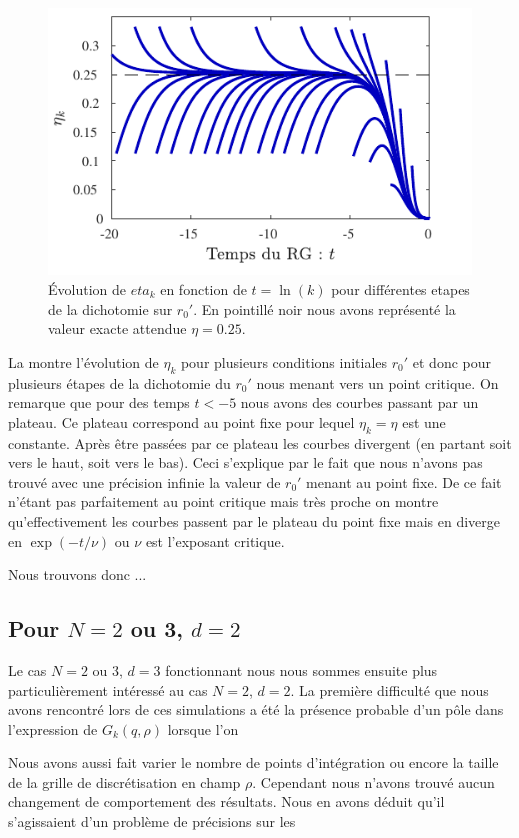\documentclass[10pt]{article}
\begin{document}
\begin{multicols}{2}
\begin{figure}[H]
	\begin{center}
		\includegraphics[width=0.95\columnwidth]{etakd2.pdf}
		\caption{Évolution de $eta_k$ en fonction de $t= \ln(k)$ pour différentes etapes de la dichotomie sur $r_0'$. En pointillé noir nous avons représenté la valeur exacte attendue $\eta = 0.25$. }
		\label{fig:etakd2}
	\end{center}
\end{figure}

La  montre l'évolution de $\eta_k$ pour plusieurs conditions initiales $r_0'$ et donc pour plusieurs étapes de la dichotomie du $r_0'$ nous menant vers un point critique. On remarque que pour des temps $t<-5$ nous avons des courbes passant par un plateau. Ce plateau correspond au point fixe pour lequel $\eta_k = \eta$ est une constante. Après être passées par ce plateau les courbes divergent (en partant soit vers le haut, soit vers le bas). Ceci s'explique par le fait que nous n'avons pas trouvé avec une précision infinie la valeur de $r_0'$ menant au point fixe. De ce fait n'étant pas parfaitement au point critique mais très proche on montre qu'effectivement les courbes passent par le plateau du point fixe mais en diverge en $\exp(-t/\nu)$ ou $\nu$ est l'exposant critique.

Nous trouvons donc ...\\



\subsection{Pour $N = 2$ ou 3, $d=2$}

Le cas $N = 2$ ou 3, $d=3$ fonctionnant nous nous sommes ensuite plus particulièrement intéressé au cas $N = 2$, $d = 2$. La première difficulté que nous avons rencontré lors de ces simulations a été la présence probable d'un pôle dans l'expression de $G_k(q, \rho)$ lorsque l'on 

Nous avons aussi fait varier le nombre de points d'intégration ou encore la taille de la grille de discrétisation en champ $\rho$. Cependant nous n'avons trouvé aucun changement de comportement des résultats.
Nous en avons déduit qu'il s'agissaient d'un problème de précisions sur les

\end{multicols}
\end{document}
